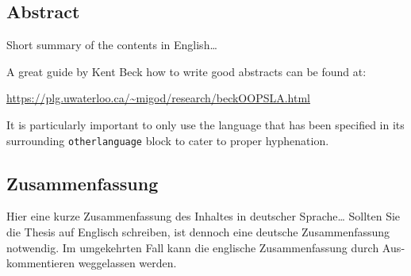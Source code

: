 \begingroup
\let\clearpage\relax
\let\cleardoublepage\relax
\let\cleardoublepage\relax

\begin{otherlanguage}{american}
\chapter*{Abstract}
Short summary of the contents in English\dots 

A great guide by Kent Beck how to write good abstracts can be found at:  
\begin{center}
\url{https://plg.uwaterloo.ca/~migod/research/beckOOPSLA.html}
\end{center}
It is particularly important to only use the language that has been specified in its surrounding \texttt{otherlanguage} block to cater to proper hyphenation.

\end{otherlanguage}

\vfill

\begin{otherlanguage}{ngerman}
\chapter*{Zusammenfassung}
Hier eine kurze Zusammenfassung des Inhaltes in deutscher Sprache\dots 
Sollten Sie die Thesis auf Englisch schreiben, ist dennoch eine deutsche Zusammenfassung notwendig.
Im umgekehrten Fall kann die englische Zusammenfassung durch Auskommentieren weggelassen werden.
\end{otherlanguage}

\endgroup			

\vfill
